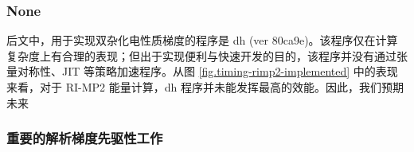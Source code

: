 \subsubsection{None}

\newpage








后文中，用于实现双杂化电性质梯度的程序是 dh (ver 80ca9e)。该程序仅在计算复杂度上有合理的表现；但出于实现便利与快速开发的目的，该程序并没有通过张量对称性、JIT 等策略加速程序。从图 \ref{fig.timing-rimp2-implemented} 中的表现来看，对于 RI-MP2 能量计算，dh 程序并未能发挥最高的效能。因此，我们预期未来

\subsubsection{重要的解析梯度先驱性工作}

